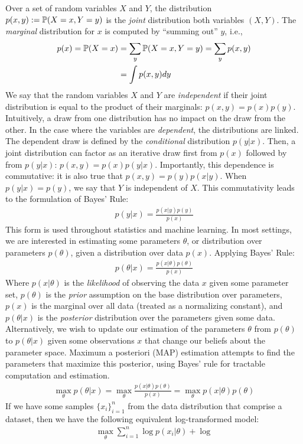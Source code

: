 Over a set of random variables $X$ and $Y$, the distribution $p(x,y):= \mathbb{P}(X=x,Y=y)$ is the \textit{joint} distribution both variables $(X,Y)$. The \textit{marginal} distribution for $x$ is computed by ``summing out'' $y$, i.e.,
\begin{align}
p(x) = \mathbb{P}(X=x) &= \sum_y \mathbb{P}(X=x,Y=y) = \sum_y p(x,y) \\
&= \int p(x,y) dy
\end{align}
We say that the random variables $X$ and $Y$ are \textit{independent} if their joint distribution is equal to the product of their marginals: $p(x,y) = p(x)p(y)$.
Intuitively, a draw from one distribution has no impact on the draw from the other. In the case where the variables are \textit{dependent}, the distributions are linked. The dependent draw is defined by the \textit{conditional} distribution $p(y|x)$. Then, a joint distribution can factor as an iterative draw first from $p(x)$ followed by from $p(y|x)$: $p(x,y) = p(x)p(y|x)$. Importantly, this dependence is commutative: it is also true that $p(x,y) = p(y)p(x|y)$. When $p(y|x) = p(y)$, we say that $Y$ is independent of $X$. This commutativity leads to the formulation of Bayes' Rule:
\begin{align}
    p(y|x) = \frac{p(x|y)p(y)}{p(x)}
\end{align}
This form is used throughout statistics and machine learning. In most settings, we are interested in estimating some parameters $\theta$, or distribution over parameters $p(\theta)$, given a distribution over data $p(x)$. Applying Bayes' Rule:
\begin{align}
    p(\theta|x) = \frac{p(x|\theta)p(\theta)}{p(x)}
\end{align}
Where $p(x|\theta)$ is the \textit{likelihood} of observing the data $x$ given some parameter set, $p(\theta)$ is the \textit{prior} assumption on the base distribution over parameters, $p(x)$ is the marginal over all data (treated as a normalizing constant), and $p(\theta|x)$ is the \textit{posterior} distribution over the parameters given some data.
Alternatively, we wish to update our estimation of the parameters $\theta$ from $p(\theta)$ to $p(\theta|x)$ given some observations $x$ that change our beliefs about the parameter space.
Maximum a posteriori (MAP) estimation attempts to find the parameters that maximize this posterior, using Bayes' rule for tractable computation and estimation.
\begin{align}\label{eq:map}
	\max_\theta p(\theta|x) = \max_\theta \frac{p(x|\theta)p(\theta)}{p(x)} =  \max_\theta p(x|\theta)p(\theta)
\end{align}
If we have some samples $\{x_i\}_{i=1}^n$ from the data distribution that comprise a dataset,
then we have the following equivalent log-transformed model:
\begin{align}
	\max_\theta \sum_{i=1}^n \log p(x_i|\theta) + \log
\end{align}

